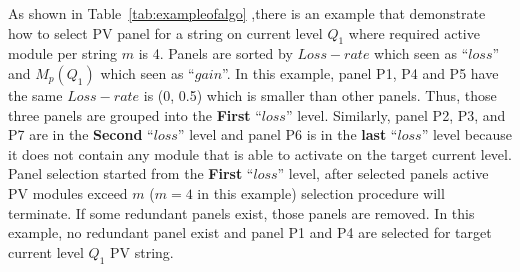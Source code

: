 \documentclass[journal]{IEEEtran}
\begin{document}

As shown in Table~\ref{tab:exampleofalgo} ,there is an example that demonstrate how to select PV panel for a string on current level $Q_{1}$ where required active module per string $m$ is 4.
Panels are sorted by $Loss-rate$ which seen as ``$loss$'' and $M_{p}(Q_{1})$ which seen as ``$gain$''.
In this example, panel P1, P4 and P5 have the same $Loss-rate$ is (0, 0.5) which is smaller than other panels.
Thus, those three panels are grouped into the \textbf{First} ``$loss$'' level.
Similarly, panel P2, P3, and P7 are in the \textbf{Second} ``$loss$'' level and panel P6 is in the \textbf{last} ``$loss$'' level because it does not contain any module that is able to activate on the target current level.
Panel selection started from the \textbf{First} ``$loss$'' level, after selected panels active PV modules exceed $m$ ($m=4$ in this example) selection procedure will terminate.
If some redundant panels exist, those panels are removed.
In this example, no redundant panel exist and panel P1 and P4 are selected for target current level $Q_{1}$ PV string.
\end{document}
